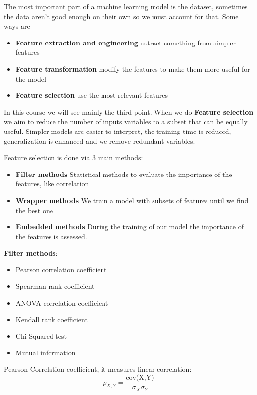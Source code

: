 The most important part of a machine learning model is the dataset, sometimes the data aren't good enough on their own so we must account for that. Some ways are

\begin{itemize}
    \item \textbf{Feature extraction and engineering} \ra extract something from simpler features
    \item \textbf{Feature transformation} \ra modify the features to make them more useful for the model
    \item \textbf{Feature selection} \ra use the most relevant features
\end{itemize}

In this course we will see mainly the third point. When we do \textbf{Feature selection} we aim to reduce the number of inputs variables to a subset that can be equally useful. Simpler models are easier to interpret, the training time is reduced, generalization is enhanced and we remove redundant variables.

\vspace{10pt}

Feature selection is done via 3 main methods:
\begin{itemize}
    \item \textbf{Filter methods} \ra Statistical methods to evaluate the importance of the features, like correlation
    \item \textbf{Wrapper methods} \ra We train a model with subsets of features until we find the best one
    \item \textbf{Embedded methods} \ra During the training of our model the importance of the features is assessed. 
\end{itemize}

\textbf{Filter methods}:
\begin{itemize}
    \item Pearson correlation coefficient
    \item Spearman rank coefficient
    \item ANOVA correlation coefficient
    \item Kendall rank coefficient
    \item Chi-Squared test
    \item Mutual information
\end{itemize}

\vspace{10pt}

Pearson Correlation coefficient, it measures linear correlation:
\begin{equation*}
    \rho_{X,Y} = \frac{\text{cov(X,Y)}}{\sigma_X \sigma_Y}
\end{equation*}


